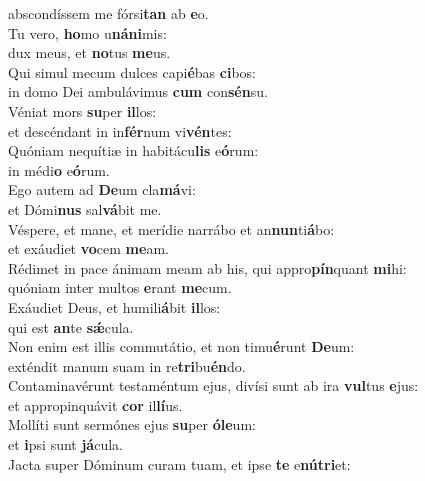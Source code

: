 \oddverse abscondíssem me fórsi\textbf{tan} ab \textbf{e}o.\\
\evenverse Tu vero, \textbf{ho}mo u\textbf{ná}\textbf{ni}mis:~\*\\
\evenverse dux meus, et \textbf{no}tus \textbf{me}us.\\
\oddverse Qui simul mecum dulces capi\textbf{é}bas \textbf{ci}bos:~\*\\
\oddverse in domo Dei ambulávimus \textbf{cum} con\textbf{sén}su.\\
\evenverse Véniat mors \textbf{su}per \textbf{il}los:~\*\\
\evenverse et descéndant in in\textbf{fér}num vi\textbf{vén}tes:\\
\oddverse Quóniam nequítiæ in habitácu\textbf{lis} e\textbf{ó}rum:~\*\\
\oddverse in médi\textbf{o} e\textbf{ó}rum.\\
\evenverse Ego autem ad \textbf{De}um cla\textbf{má}vi:~\*\\
\evenverse et Dómi\textbf{nus} sal\textbf{vá}bit me.\\
\oddverse Véspere, et mane, et merídie narrábo et an\textbf{nun}ti\textbf{á}bo:~\*\\
\oddverse et exáudiet \textbf{vo}cem \textbf{me}am.\\
\evenverse Rédimet in pace ánimam meam ab his, qui appro\textbf{pín}quant \textbf{mi}hi:~\*\\
\evenverse quóniam inter multos \textbf{e}rant \textbf{me}cum.\\
\oddverse Exáudiet Deus, et humili\textbf{á}bit \textbf{il}los:~\*\\
\oddverse qui est \textbf{an}te \textbf{sǽ}cula.\\
\evenverse Non enim est illis commutátio, et non timu\textbf{é}runt \textbf{De}um:~\*\\
\evenverse exténdit manum suam in re\textbf{tri}bu\textbf{én}do.\\
\oddverse Contaminavérunt testaméntum ejus, divísi sunt ab ira \textbf{vul}tus \textbf{e}jus:~\*\\
\oddverse et appropinquávit \textbf{cor} il\textbf{lí}us.\\
\evenverse Mollíti sunt sermónes ejus \textbf{su}per \textbf{ó}\textbf{le}um:~\*\\
\evenverse et \textbf{i}psi sunt \textbf{já}cula.\\
\oddverse Jacta super Dóminum curam tuam, et ipse \textbf{te} e\textbf{nú}\textbf{tri}et:~\*\\
